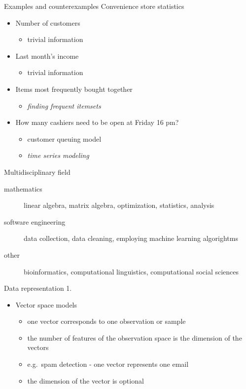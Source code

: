 \documentclass[bigger]{beamer}
\begin{document}
\begin{frame}{Examples and counterexamples}
    Convenience store statistics
    \begin{itemize}
        \item Number of customers
            \begin{itemize}
                \item trivial information
            \end{itemize}
        \item Last month's income
            \begin{itemize}
                \item trivial information
            \end{itemize}
        \item Items most frequently bought together
            \begin{itemize}
                \item \emph{finding frequent itemsets}
            \end{itemize}
        \item How many cashiers need to be open at Friday 16 pm?
            \begin{itemize}
                \item customer queuing model
                \item \emph{time series modeling}
            \end{itemize}
    \end{itemize}
\end{frame}

\begin{frame}{Multidisciplinary field}
    \begin{description}
        \item[mathematics] linear algebra, matrix algebra, optimization, statistics, analysis
        \item[software engineering] data collection, data cleaning, employing machine learning algorightms
        \item[other] bioinformatics, computational linguistics, computational social sciences
    \end{description}
\end{frame}

\begin{frame}{Data representation 1.}
    \begin{itemize}
        \item Vector space models
            \begin{itemize}
                \item one vector corresponds to one observation or sample
                \item the number of features of the observation space is the dimension of the vectors
                \item e.g.~spam detection - one vector represents one email
                \item the dimension of the vector is optional
            \end{itemize}
    \end{itemize}
\end{frame}
\end{document}
